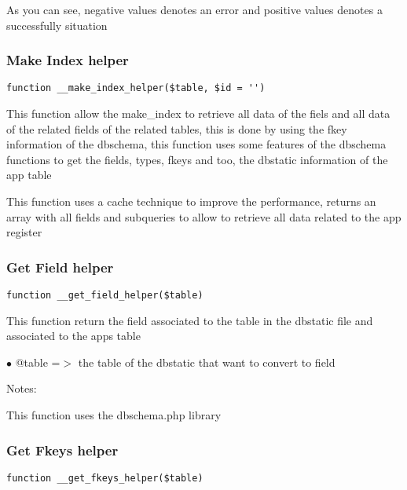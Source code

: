 \documentclass[a4paper]{article}
\begin{document}
As you can see, negative values denotes an error and positive values denotes a successfully situation

\hypertarget{toc483}{}
\subsubsection{Make Index helper}

\begin{lstlisting}
function __make_index_helper($table, $id = '')
\end{lstlisting}

This function allow the make\_index to retrieve all data of the fiels
and all data of the related fields of the related tables, this is done
by using the fkey information of the dbschema, this function uses some
features of the dbschema functions to get the fields, types, fkeys and
too, the dbstatic information of the app table

This function uses a cache technique to improve the performance, returns
an array with all fields and subqueries to allow to retrieve all data
related to the app register

\hypertarget{toc484}{}
\subsubsection{Get Field helper}

\begin{lstlisting}
function __get_field_helper($table)
\end{lstlisting}

This function return the field associated to the table in the dbstatic
file and associated to the apps table

\begin{compactitem}
\item[\color{myblue}$\bullet$] @table =$>$ the table of the dbstatic that want to convert to field
\end{compactitem}

Notes:

This function uses the dbschema.php library

\hypertarget{toc485}{}
\subsubsection{Get Fkeys helper}

\begin{lstlisting}
function __get_fkeys_helper($table)
\end{lstlisting}
\end{document}
